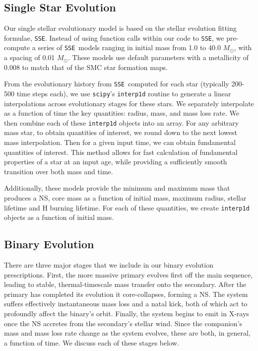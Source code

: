 \documentclass[usenatbib]{mnras}
\newcommand{\Msun}{\ifmmode {M_{\odot}}\else${M_{\odot}}$\fi}
\newcommand{\sse}{{\tt SSE}}
\begin{document}
\subsection{Single Star Evolution} \label{sec:single_star}

Our single stellar evolutionary model is based on the stellar evolution fitting formulae, \sse \citep{hurley00}. Instead of using function calls within our code to \sse, we pre-compute a series of \sse\ models ranging in initial mass from 1.0 to 40.0 \Msun, with a spacing of 0.01 \Msun. These models use default parameters with a metallicity of 0.008 to match that of the SMC star formation maps.

From the evolutionary history from \sse\ computed for each star (typically 200-500 time steps each), we use {\tt scipy}'s {\tt interp1d} routine to generate a linear interpolations across evolutionary stages for these stars. We separately interpolate as a function of time the key quantities: radius, mass, and mass loss rate. We then combine each of these {\tt interp1d} objects into an array. For any arbitrary mass star, to obtain quantities of interest, we round down to the next lowest mass interpolation. Then for a given input time, we can obtain fundamental quantities of interest. This method allows for fast calculation of fundamental properties of a star at an input age, while providing a sufficiently smooth transition over both mass and time.

Additionally, these models provide the minimum and maximum mass that produces a NS, core mass as a function of initial mass, maximum radius, stellar lifetime and H burning lifetime. For each of these quantities, we create {\tt interp1d} objects as a function of initial mass.



\subsection{Binary Evolution} \label{sec:binary_evolve}

There are three major stages that we include in our binary evolution prescriptions. First, the more massive primary evolves first off the main sequence, leading to stable, thermal-timescale mass transfer onto the secondary. After the primary has completed its evolution it core-collapses, forming a NS. The system suffers effectively instantaneous mass loss and a natal kick, both of which act to profoundly affect the binary's orbit. Finally, the system begins to emit in X-rays once the NS accretes from the secondary's stellar wind. Since the companion's mass and mass loss rate change as the system evolves, these are both, in general, a function of time. We discuss each of these stages below.
\end{document}
